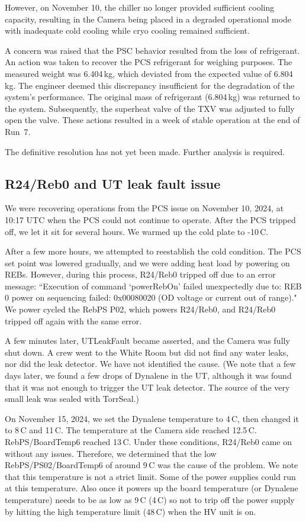 However, on November 10, the chiller no longer provided sufficient cooling capacity, resulting in the Camera being placed in a degraded operational mode with inadequate cold cooling while cryo cooling remained sufficient.

A concern was raised that the PSC behavior resulted from the loss of refrigerant. An action was taken to recover the PCS refrigerant for weighing purposes. The measured weight was 6.404\,kg, which deviated from the expected value of 6.804\,kg. The engineer deemed this discrepancy insufficient for the degradation of the system's performance. The original mass of refrigerant (6.804\,kg) was returned to the system. Subsequently, the superheat valve of the TXV was adjusted to fully open the valve. These actions resulted in a week of stable operation at the end of Run~7.

The definitive resolution has not yet been made. Further analysis is required.


\clearpage
\subsection{R24/Reb0 and UT leak fault issue}\label{sec:lowtempissue}
We were recovering operations from the PCS issue on November 10, 2024, at 10:17 UTC when the PCS could not continue to operate. After the PCS tripped off, we let it sit for several hours. We warmed up the cold plate to -10\,C.

After a few more hours, we attempted to reestablish the cold condition. The PCS set point was lowered gradually, and we were adding heat load by powering on REBs. However, during this process, R24/Reb0 tripped off due to an error message: ``Execution of command `powerRebOn' failed unexpectedly due to: REB 0 power on sequencing failed: 0x00080020 (OD voltage or current out of range)." We power cycled the RebPS P02, which powers R24/Reb0, and R24/Reb0 tripped off again with the same error.

A few minutes later, UTLeakFault became asserted, and the Camera was fully shut down. A crew went to the White Room but did not find any water leaks, nor did the leak detector. We have not identified the cause. (We note that a few days later, we found a few drops of Dynalene in the UT, although it was found that it was not enough to trigger the UT leak detector. The source of the very small leak was sealed with TorrSeal.)

On November 15, 2024, we set the Dynalene temperature to 4\,C, then changed it to 8\,C and 11\,C. The temperature at the Camera side reached 12.5\,C. RebPS/BoardTemp6 reached 13\,C. Under these conditions, R24/Reb0 came on without any issues. Therefore, we determined that the low RebPS/PS02/BoardTemp6 of around 9\,C was the cause of the problem. We note that this temperature is not a strict limit. Some of the power supplies could run at this temperature. Also once it powers up the board temperature (or Dynalene temperature) needs to be as low as 9\,C (4\,C) so not to trip off the power supply by hitting the high temperature limit (48\,C) when the HV unit is on.

